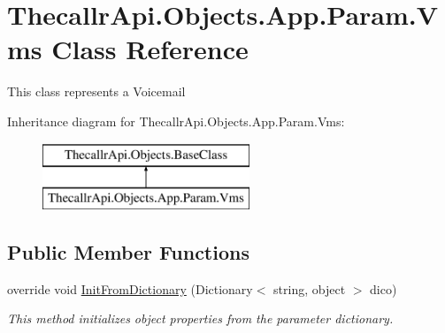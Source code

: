 \hypertarget{class_thecallr_api_1_1_objects_1_1_app_1_1_param_1_1_vms}{\section{Thecallr\+Api.\+Objects.\+App.\+Param.\+Vms Class Reference}
\label{class_thecallr_api_1_1_objects_1_1_app_1_1_param_1_1_vms}
}


This class represents a Voicemail  


Inheritance diagram for Thecallr\+Api.\+Objects.\+App.\+Param.\+Vms\+:\begin{figure}[H]
\begin{center}
\leavevmode
\includegraphics[height=2.000000cm]{class_thecallr_api_1_1_objects_1_1_app_1_1_param_1_1_vms}
\end{center}
\end{figure}
\subsection*{Public Member Functions}
\begin{DoxyCompactItemize}
\item 
override void \hyperlink{class_thecallr_api_1_1_objects_1_1_app_1_1_param_1_1_vms_a615f4c8d0771129b8223963919809b1c}{Init\+From\+Dictionary} (Dictionary$<$ string, object $>$ dico)
\begin{DoxyCompactList}\small\item\em This method initializes object properties from the parameter dictionary. \end{DoxyCompactList}\end{DoxyCompactItemize}
